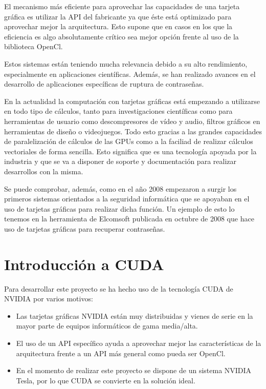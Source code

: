 El mecanismo más eficiente para aprovechar las capacidades de una tarjeta gráfica es utilizar la API del fabricante ya que éste está optimizado para aprovechar mejor la arquitectura. Esto supone que en casos en los que la eficiencia es algo absolutamente crítico sea mejor opción frente al uso de la biblioteca OpenCl.

Estos sistemas están teniendo mucha relevancia debido a su alto rendimiento, especialmente en aplicaciones científicas. Además, se han realizado avances en el desarrollo de aplicaciones específicas de ruptura de contraseñas.

En la actualidad la computación con tarjetas gráficas está empezando a utilizarse en todo tipo de cálculos, tanto para investigaciones científicas  como para herramientas de usuario como descompresores de vídeo y audio, filtros gráficos en herramientas de diseño o videojuegos. Todo esto gracias a las grandes capacidades de paralelización de cálculos de las GPUs como a la faciliad de realizar cálculos vectoriales de forma sencilla. Esto significa que es una tecnología apoyada por la industria y que se va a disponer de soporte y documentación para realizar desarrollos con la misma.

Se puede comprobar, además, como en el año 2008 empezaron a surgir los primeros sistemas orientados a la seguridad informática que se apoyaban en el uso de tarjetas gráficas para realizar dicha función. Un ejemplo de esto lo tenemos en la herramienta de Elcomsoft publicada en octubre de 2008 \cite{website:elcomsoft_press} que hace uso de tarjetas gráficas para recuperar contraseñas.

\section{Introducción a CUDA}

Para desarrollar este proyecto se ha hecho uso de la tecnología CUDA de NVIDIA por varios motivos:
\begin{itemize}
	\item Las tarjetas gráficas NVIDIA están muy distribuidas y vienes de serie en la mayor parte de equipos informáticos de gama media/alta.
	\item El uso de un API específico ayuda a aprovechar mejor las características de la arquitectura frente a un API más general como pueda ser OpenCl.
	\item En el momento de realizar este proyecto se dispone de un sistema NVIDIA Tesla, por lo que CUDA se convierte en la solución ideal.
\end{itemize}

